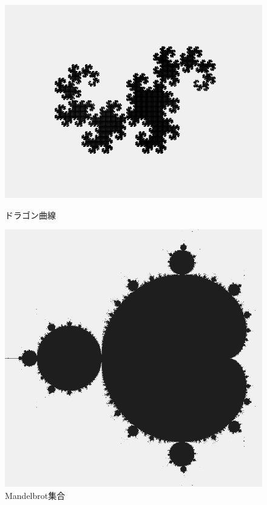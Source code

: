 \documentclass[dvipdfmx]{jsarticle}
\theoremstyle{definition}
\begin{document}
\begin{figure}[ht]
\begin{minipage}{0.5\hsize}
    \begin{center}
        \includegraphics[scale=0.22]{figure/dragon_curve.png}
    \end{center}
    \caption{ドラゴン曲線}
\end{minipage}
\begin{minipage}{0.49\hsize}
    \begin{center}
        \includegraphics[scale=0.20]{figure/mandelbrot_set.png}
    \end{center}
    \caption{Mandelbrot集合}
    \label{pic_mbset}
\end{minipage}
\end{figure}
\end{document}
